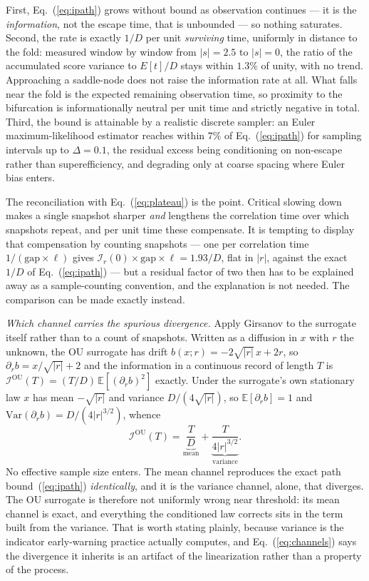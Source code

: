 \documentclass[%
 twocolumn,
 superscriptaddress,
 amsmath,amssymb,
 aps,
 pre,
 floatfix,
]{revtex4-2}
\newcommand{\Ifish}{\mathcal{I}}
\begin{document}
First, Eq.~(\ref{eq:ipath}) grows without bound as observation continues --- it is the \emph{information}, not the escape time, that is unbounded --- so nothing saturates.  Second, the rate is exactly $1/D$ per unit \emph{surviving} time, uniformly in distance to the fold: measured window by window from $|s|=2.5$ to $|s|=0$, the ratio of the accumulated score variance to $E[t]/D$ stays within $1.3\%$ of unity, with no trend.  Approaching a saddle-node does not raise the information rate at all.  What falls near the fold is the expected remaining observation time, so proximity to the bifurcation is informationally neutral per unit time and strictly negative in total.  Third, the bound is attainable by a realistic discrete sampler: an Euler maximum-likelihood estimator reaches within $7\%$ of Eq.~(\ref{eq:ipath}) for sampling intervals up to $\Delta=0.1$, the residual excess being conditioning on non-escape rather than superefficiency, and degrading only at coarse spacing where Euler bias enters.

The reconciliation with Eq.~(\ref{eq:plateau}) is the point.  Critical slowing down makes a single snapshot sharper \emph{and} lengthens the correlation time over which snapshots repeat, and per unit time these compensate.  It is tempting to display that compensation by counting snapshots --- one per correlation time $1/(\mathrm{gap}\times\ell)$ gives $\Ifish_r(0)\times\mathrm{gap}\times\ell=1.93/D$, flat in $|r|$, against the exact $1/D$ of Eq.~(\ref{eq:ipath}) --- but a residual factor of two then has to be explained away as a sample-counting convention, and the explanation is not needed.  The comparison can be made exactly instead.

\emph{Which channel carries the spurious divergence.}  Apply Girsanov to the surrogate itself rather than to a count of snapshots.  Written as a diffusion in $x$ with $r$ the unknown, the OU surrogate has drift $b(x;r)=-2\sqrt{|r|}\,x+2r$, so $\partial_r b=x/\sqrt{|r|}+2$ and the information in a continuous record of length $T$ is $\Ifish^{\mathrm{OU}}(T)=(T/D)\,\mathbb{E}[(\partial_r b)^2]$ exactly.  Under the surrogate's own stationary law $x$ has mean $-\sqrt{|r|}$ and variance $D/(4\sqrt{|r|})$, so $\mathbb{E}[\partial_r b]=1$ and $\mathrm{Var}(\partial_r b)=D/(4|r|^{3/2})$, whence
\begin{equation}
\label{eq:channels}
\Ifish^{\mathrm{OU}}(T)
=\underbrace{\frac{T}{D}}_{\text{mean}}
+\underbrace{\frac{T}{4|r|^{3/2}}}_{\text{variance}} .
\end{equation}
No effective sample size enters.  The mean channel reproduces the exact path bound~(\ref{eq:ipath}) \emph{identically}, and it is the variance channel, alone, that diverges.  The OU surrogate is therefore not uniformly wrong near threshold: its mean channel is exact, and everything the conditioned law corrects sits in the term built from the variance.  That is worth stating plainly, because variance is the indicator early-warning practice actually computes, and Eq.~(\ref{eq:channels}) says the divergence it inherits is an artifact of the linearization rather than a property of the process.
\end{document}
